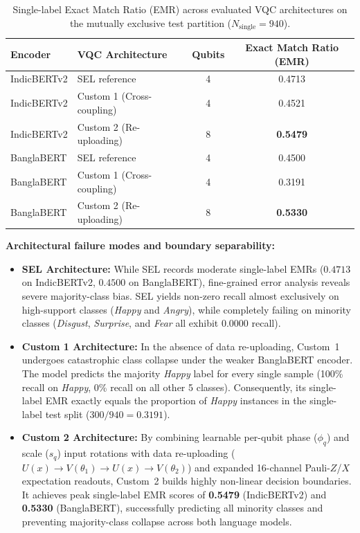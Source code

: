 \documentclass[runningheads]{llncs}
\begin{document}
\begin{table}[htbp]
\centering
\caption{Single-label Exact Match Ratio (EMR) across evaluated VQC architectures on the mutually exclusive test partition ($N_{\text{single}} = 940$).}
\label{tab:single_label_emr}
\begin{tabular}{l|l|c|c}
\toprule
\textbf{Encoder} & \textbf{VQC Architecture} & \textbf{Qubits} & \textbf{Exact Match Ratio (EMR)} \\
\midrule
IndicBERTv2 & SEL reference & 4 & 0.4713 \\
IndicBERTv2 & Custom 1 (Cross-coupling) & 4 & 0.4521 \\
IndicBERTv2 & Custom 2 (Re-uploading) & 8 & \textbf{0.5479} \\
\midrule
BanglaBERT  & SEL reference & 4 & 0.4500 \\
BanglaBERT  & Custom 1 (Cross-coupling) & 4 & 0.3191 \\
BanglaBERT  & Custom 2 (Re-uploading) & 8 & \textbf{0.5330} \\
\bottomrule
\end{tabular}
\end{table}

\noindent\textbf{Architectural failure modes and boundary separability:}
\begin{itemize}[leftmargin=*]
    \item \textbf{SEL Architecture:} While SEL records moderate single-label EMRs ($0.4713$ on IndicBERTv2, $0.4500$ on BanglaBERT), fine-grained error analysis reveals severe majority-class bias. SEL yields non-zero recall almost exclusively on high-support classes (\emph{Happy} and \emph{Angry}), while completely failing on minority classes (\emph{Disgust}, \emph{Surprise}, and \emph{Fear} all exhibit $0.0000$ recall).
    \item \textbf{Custom 1 Architecture:} In the absence of data re-uploading, Custom~1 undergoes catastrophic class collapse under the weaker BanglaBERT encoder. The model predicts the majority \emph{Happy} label for every single sample (100\% recall on \emph{Happy}, 0\% recall on all other 5 classes). Consequently, its single-label EMR exactly equals the proportion of \emph{Happy} instances in the single-label test split ($300 / 940 = 0.3191$).
    \item \textbf{Custom 2 Architecture:} By combining learnable per-qubit phase ($\phi_q$) and scale ($s_q$) input rotations with data re-uploading ($U(x) \to V(\theta_1) \to U(x) \to V(\theta_2)$) and expanded 16-channel Pauli-$Z$/$X$ expectation readouts, Custom~2 builds highly non-linear decision boundaries. It achieves peak single-label EMR scores of \textbf{0.5479} (IndicBERTv2) and \textbf{0.5330} (BanglaBERT), successfully predicting all minority classes and preventing majority-class collapse across both language models.
\end{itemize}
\end{document}
